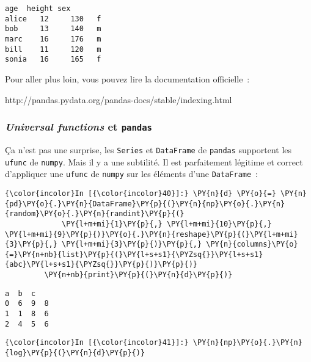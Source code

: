     \begin{Verbatim}[commandchars=\\\{\},frame=single,framerule=0.3mm,rulecolor=\color{cellframecolor}]
       age  height sex
alice   12     130   f
bob     13     140   m
marc    16     176   m
bill    11     120   m
sonia   16     165   f
\end{Verbatim}

    Pour aller plus loin, vous pouvez lire la documentation officielle~:

http://pandas.pydata.org/pandas-docs/stable/indexing.html

    \hypertarget{universal-functions-et-pandas}{%
\subsubsection{\texorpdfstring{\emph{Universal functions} et
\texttt{pandas}}{Universal functions et pandas}}\label{universal-functions-et-pandas}}

    Ça n'est pas une surprise, les \texttt{Series} et \texttt{DataFrame} de
\texttt{pandas} supportent les \texttt{ufunc} de \texttt{numpy}. Mais il
y a une subtilité. Il est parfaitement légitime et correct d'appliquer
une \texttt{ufunc} de \texttt{numpy} sur les éléments d'une
\texttt{DataFrame}~:

    \begin{Verbatim}[commandchars=\\\{\},frame=single,framerule=0.3mm,rulecolor=\color{cellframecolor}]
{\color{incolor}In [{\color{incolor}40}]:} \PY{n}{d} \PY{o}{=} \PY{n}{pd}\PY{o}{.}\PY{n}{DataFrame}\PY{p}{(}\PY{n}{np}\PY{o}{.}\PY{n}{random}\PY{o}{.}\PY{n}{randint}\PY{p}{(}
             \PY{l+m+mi}{1}\PY{p}{,} \PY{l+m+mi}{10}\PY{p}{,} \PY{l+m+mi}{9}\PY{p}{)}\PY{o}{.}\PY{n}{reshape}\PY{p}{(}\PY{l+m+mi}{3}\PY{p}{,} \PY{l+m+mi}{3}\PY{p}{)}\PY{p}{,} \PY{n}{columns}\PY{o}{=}\PY{n+nb}{list}\PY{p}{(}\PY{l+s+s1}{\PYZsq{}}\PY{l+s+s1}{abc}\PY{l+s+s1}{\PYZsq{}}\PY{p}{)}\PY{p}{)}
         \PY{n+nb}{print}\PY{p}{(}\PY{n}{d}\PY{p}{)}
\end{Verbatim}


    \begin{Verbatim}[commandchars=\\\{\},frame=single,framerule=0.3mm,rulecolor=\color{cellframecolor}]
   a  b  c
0  6  9  8
1  1  8  6
2  4  5  6
\end{Verbatim}

    \begin{Verbatim}[commandchars=\\\{\},frame=single,framerule=0.3mm,rulecolor=\color{cellframecolor}]
{\color{incolor}In [{\color{incolor}41}]:} \PY{n}{np}\PY{o}{.}\PY{n}{log}\PY{p}{(}\PY{n}{d}\PY{p}{)}
\end{Verbatim}


